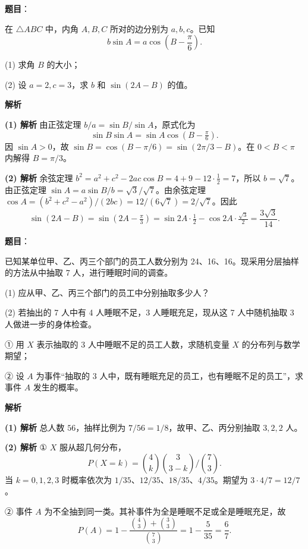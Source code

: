 \begin{answer}

\textbf{题目}：

在 $\triangle ABC$ 中，内角 $A,B,C$ 所对的边分别为 $a,b,c$。已知
\nopagebreak[4]
\[
b\sin A=a\cos\left(B-\frac\pi6\right).
\]

(1) 求角 $B$ 的大小；

(2) 设 $a=2,c=3$，求 $b$ 和 $\sin(2A-B)$ 的值。

\textbf{解析}

\textbf{(1) 解析} 由正弦定理 $b/a=\sin B/\sin A$，原式化为
\nopagebreak[4]
\[\sin B\sin A=\sin A\cos(B-\tfrac\pi6).\]
因 $\sin A>0$，故 $\sin B=\cos(B-\pi/6)=\sin(2\pi/3-B)$。在 $0<B<\pi$ 内解得 $B=\pi/3$。

\textbf{(2) 解析} 余弦定理 $b^2=a^2+c^2-2ac\cos B=4+9-12\cdot\tfrac12=7$，所以 $b=\sqrt7$。由正弦定理 $\sin A=a\sin B/b=\sqrt3/\sqrt7$。由余弦定理 $\cos A=(b^2+c^2-a^2)/(2bc)=12/(6\sqrt7)=2/\sqrt7$。因此
\nopagebreak[4]
\[\sin(2A-B)=\sin(2A-\tfrac\pi3)=\sin2A\cdot\tfrac12-\cos2A\cdot\tfrac{\sqrt3}2=\frac{3\sqrt3}{14}.\]



\end{answer}
\begin{answer}

\textbf{题目}：

已知某单位甲、乙、丙三个部门的员工人数分别为 24、16、16。现采用分层抽样的方法从中抽取 7 人，进行睡眠时间的调查。

(1) 应从甲、乙、丙三个部门的员工中分别抽取多少人？

(2) 若抽出的 7 人中有 4 人睡眠不足，3 人睡眠充足，现从这 7 人中随机抽取 3 人做进一步的身体检查。

① 用 $X$ 表示抽取的 3 人中睡眠不足的员工人数，求随机变量 $X$ 的分布列与数学期望；

② 设 $A$ 为事件“抽取的 3 人中，既有睡眠充足的员工，也有睡眠不足的员工”，求事件 $A$ 发生的概率。

\textbf{解析}

\textbf{(1) 解析} 总人数 $56$，抽样比例为 $7/56=1/8$，故甲、乙、丙分别抽取 $3,2,2$ 人。

\textbf{(2) 解析} ① $X$ 服从超几何分布，
\nopagebreak[4]
\[
P(X=k)=\binom4k\binom3{3-k}/\binom73.
\]
当 $k=0,1,2,3$ 时概率依次为 $1/35$、$12/35$、$18/35$、$4/35$。期望为 $3\cdot4/7=12/7$。

② 事件 $A$ 为不全抽到同一类。其补事件为全是睡眠不足或全是睡眠充足，故
\nopagebreak[4]
\[P(A)=1-\frac{\binom43+\binom33}{\binom73}=1-\frac5{35}=\frac67.\]



\end{answer}
